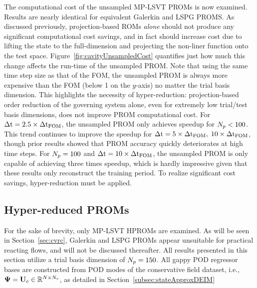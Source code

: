 The computational cost of the unsampled MP-LSVT PROMs is now examined. Results are nearly identical for equivalent Galerkin and LSPG PROMS. As discussed previously, projection-based ROMs \textit{alone} should not produce any significant computational cost savings, and in fact should increase cost due to lifting the state to the full-dimension and projecting the non-liner function onto the test space. Figure~\ref{fig:cavityUnsampledCost} quantifies just how much this change affects the run-time of the unsampled PROM. Note that using the same time step size as that of the FOM, the unsampled PROM is always more expensive than the FOM (below 1 on the $y$-axis) no matter the trial basis dimension. This highlights the necessity of hyper-reduction: projection-based order reduction of the governing system alone, even for extremely low trial/test basis dimensions, does not improve PROM computational cost. For $\Delta \text{t} = 2.5 \times \Delta \text{t}_{\text{FOM}}$, the unsampled PROM only achieves speedup for $N_p < 100$. This trend continues to improve the speedup for $\Delta \text{t} = 5 \times \Delta \text{t}_{\text{FOM}}, \; 10 \times \Delta \text{t}_{\text{FOM}}$, though prior results showed that PROM accuracy quickly deteriorates at high time steps. For $N_p = 100$ and $\Delta \text{t} = 10 \times \Delta \text{t}_{\text{FOM}}$, the unsampled PROM is only capable of achieving three times speedup, which is hardly impressive given that these results only reconstruct the training period. To realize significant cost savings, hyper-reduction must be applied.

\subsection{Hyper-reduced PROMs}
%
For the sake of brevity, only MP-LSVT HPROMs are examined. As will be seen in Section~\ref{sec:cvrc}, Galerkin and LSPG PROMs appear unsuitable for practical reacting flows, and will not be discussed thereafter. All results presented in this section utilize a trial basis dimension of $N_p = 150$. All gappy POD regressor bases are constructed from POD modes of the conservative field dataset, i.e., $\deimBasis = \consTrial \inRTwo{\numDOF}{\numResModes}$, as detailed in Section~\ref{subsec:stateApproxDEIM}

